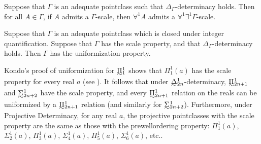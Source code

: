 \documentclass{book}%
\def\underTilde#1{{\baselineskip=0pt\vtop{\hbox{$#1$}\hbox{$\sim$}}}{}}
\newcommand{\uTPi}{\underTilde{\Pi}}
\newcommand{\uTSigma}{\underTilde{\Sigma}}
\begin{document}
\begin{theorem}
Suppose that $\Gamma$ is an adequate pointclass such that
$\Delta_{\Gamma}$-determinacy holds. Then for all $A \in \Gamma$, if\/
$A$ admits a $\Gamma$-scale, then $\forall^{1}A$ admits a
$\forall^{1}\exists^{1}\Gamma$-scale.
\end{theorem}

\begin{theorem} Suppose that $\Gamma$ is an adequate pointclass which is closed under integer quantification.
Suppose that $\Gamma$ has the scale property, and that $\Delta_{\Gamma}$-determinacy holds. Then $\Gamma$ has
the uniformization property.
\end{theorem}







Kondo's proof of uniformization for $\uTPi^{1}_{1}$ shows that $\Pi^{1}_{1}(a)$ has the scale property for every
real $a$ (see \cite[p.~419]{Kanamori}). It follows that under
$\underTilde{\Delta}^{1}_{2n}$-determinacy, $\uTPi^{1}_{2n+1}$ and
$\uTSigma^{1}_{2n+2}$ have the scale property, and every
$\uTPi^{1}_{2n+1}$ relation on the reals can be uniformized by a
$\uTPi^{1}_{2n+1}$ relation (and similarly for $\uTSigma^{1}_{2n+2}$).
Furthermore, under Projective Determinacy, for any real $a$, the
projective pointclasses with the scale property are the same as
those with the prewellordering property: $\Pi^{1}_{1}(a)$,
$\Sigma^{1}_{2}(a)$, $\Pi^{1}_{3}(a)$, $\Sigma^{1}_{4}(a)$,
$\Pi^{1}_{5}(a)$, $\Sigma^{1}_{6}(a)$, etc..
\end{document}
